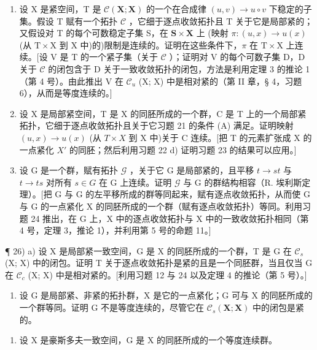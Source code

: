 \begin{enumerate}
\def\labelenumi{\arabic{enumi})}
\setcounter{enumi}{22}
\item
  设 X 是紧空间，T 是 \(\mathcal{C}(\mathbf{X};\mathbf{X})\) 的一个在合成律 \((u,v)\to u\circ v\) 下稳定的子集。假设 T 赋有一个拓扑 \(\mathcal{C}\) ，它细于逐点收敛拓扑且 T 关于它是局部紧的；又假设对 T 的每个可数稳定子集 S，在 \(\mathbf{S}\times \mathbf{X}\) 上 (映射 \(\pi : (u,x)\to u(x)\) (从 \(\mathrm{T}\times \mathrm{X}\) 到 X 中)的)限制是连续的。证明在这些条件下，\(\pi\) 在 \(\mathrm{T}\times \mathrm{X}\) 上连续。{[}设 V 是 T 的一个紧子集（关于 \(\mathcal{C}\) ）；证明对 V 的每个可数子集 D，D 关于 \(\mathcal{C}\) 的闭包含于 D 关于一致收敛拓扑的闭包，方法是利用定理 3 的推论 1（第 4 号）。由此推出 V 在 \(\mathcal{C}_u\) (X; X) 中是相对紧的（第 II 章，§ 4，习题 6），从而是等度连续的。{]}
\item
  设 X 是局部紧空间，T 是 X 的同胚所成的一个群，C 是 T 上的一个局部紧拓扑，它细于逐点收敛拓扑且关于它习题 21 的条件 (A) 满足。证明映射 \((u, x) \to u(x)\) (从 \(T \times X\) 到 X 中)关于 C 连续。{[}把 T 的元素扩张成 X 的一点紧化 \(X'\) 的同胚；然后利用习题 22 d) 证明习题 23 的结果可以应用。{]}
\item
  设 G 是一个群，赋有拓扑 \(\mathcal{G}\) ，关于它 G 是局部紧的，且平移 \(t \to st\) 与 \(t \to ts\) 对所有 \(s \in G\) 在 G 上连续。证明 \(\mathcal{G}\) 与 G 的群结构相容（R. 埃利斯定理）。{[}把 G 与 G 的左平移所成的群等同起来，赋有逐点收敛拓扑，从而使 G 与 G 的一点紧化 X 的同胚所成的一个群（赋有逐点收敛拓扑）等同。利用习题 24 推出，在 G 上，X 中的逐点收敛拓扑与 X 中的一致收敛拓扑相同（第 4 号，定理 3，推论 1），并利用第 5 号的命题 11。{]}
\end{enumerate}

¶ 26) a) 设 X 是局部紧一致空间，G 是 X 的同胚所成的一个群，T 是 G 在 \(\mathcal{C}_{s}\) (X; X) 中的闭包。证明 T 关于逐点收敛拓扑是紧的且是一个同胚群，当且仅当 G 在 \(\mathcal{C}_{c}\) (X; X) 中是相对紧的。{[}利用习题 12 与 24 以及定理 4 的推论（第 5 号）。{]}

\begin{enumerate}
\def\labelenumi{\alph{enumi})}
\setcounter{enumi}{1}
\tightlist
\item
  设 G 是局部紧、非紧的拓扑群，X 是它的一点紧化；G 可与 X 的同胚所成的一个群等同。证明 G 不是等度连续的，尽管它在 \(\mathcal{C}_{s}(\mathbf{X};\mathbf{X})\) 中的闭包是紧的。
\end{enumerate}

\begin{enumerate}
\def\labelenumi{\arabic{enumi})}
\setcounter{enumi}{26}
\tightlist
\item
  设 X 是豪斯多夫一致空间，G 是 X 的同胚所成的一个等度连续群。
\end{enumerate}

